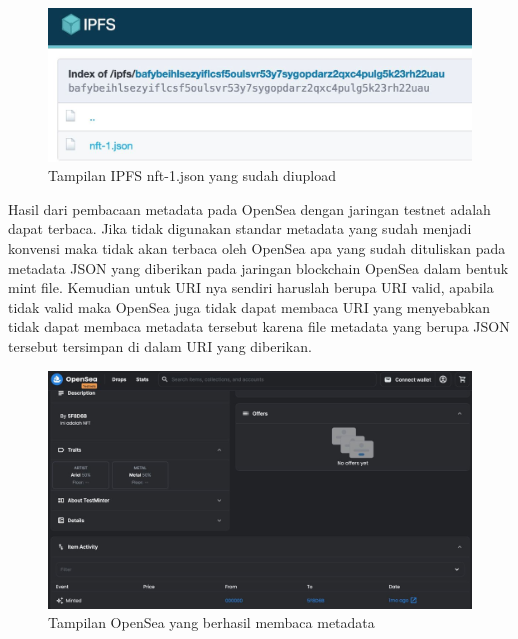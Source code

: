 \begin{figure}[H]
  \centering

  \includegraphics[scale=0.4]{gambar/nftjsonuploaded.jpg}

  \caption{Tampilan IPFS nft-1.json yang sudah diupload}
  \label{fig:ipfsjsonuploaded}
\end{figure}

Hasil dari pembacaan metadata pada OpenSea dengan jaringan testnet adalah dapat terbaca. Jika tidak digunakan standar metadata yang sudah menjadi konvensi
maka tidak akan terbaca oleh OpenSea apa yang sudah dituliskan pada metadata JSON yang diberikan pada jaringan blockchain OpenSea dalam bentuk mint file. Kemudian untuk
URI nya sendiri haruslah berupa URI valid, apabila tidak valid maka OpenSea juga tidak dapat membaca URI yang menyebabkan tidak dapat membaca metadata tersebut karena file metadata yang berupa JSON tersebut tersimpan
di dalam URI yang diberikan.

\begin{figure}[H]
  \centering

  \includegraphics[scale=0.4]{gambar/opensea-uji.jpg}

  \caption{Tampilan OpenSea yang berhasil membaca metadata}
  \label{fig:openseatest}
\end{figure}

